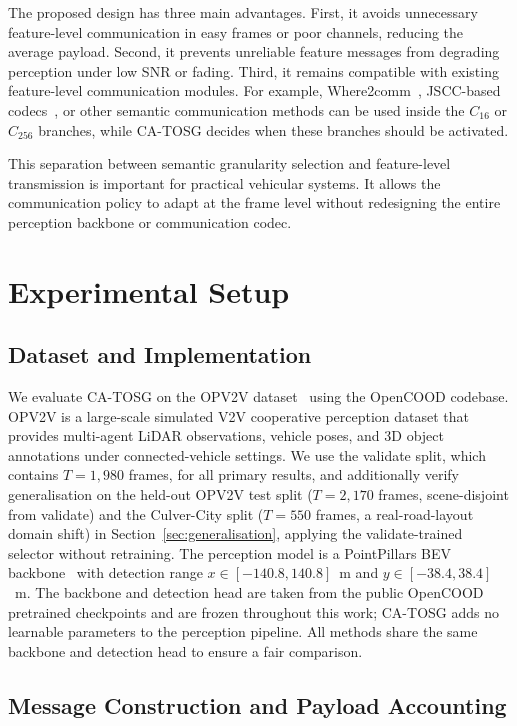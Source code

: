 \documentclass[journal]{IEEEtran}
\newcommand{\method}{CA-TOSG}
\begin{document}
The proposed design has three main advantages. First, it avoids unnecessary feature-level communication in easy frames or poor channels, reducing the average payload. Second, it prevents unreliable feature messages from degrading perception under low SNR or fading. Third, it remains compatible with existing feature-level communication modules. For example, Where2comm~\cite{hu2022where2comm}, JSCC-based codecs~\cite{sheng2024importance}, or other semantic communication methods can be used inside the $C_{16}$ or $C_{256}$ branches, while \method{} decides when these branches should be activated.

This separation between semantic granularity selection and feature-level transmission is important for practical vehicular systems. It allows the communication policy to adapt at the frame level without redesigning the entire perception backbone or communication codec.

\section{Experimental Setup}\label{sec:exp}

\subsection{Dataset and Implementation}

We evaluate \method{} on the OPV2V dataset~\cite{xu2022opv2v} using the OpenCOOD codebase. OPV2V is a large-scale simulated V2V cooperative perception dataset that provides multi-agent LiDAR observations, vehicle poses, and 3D object annotations under connected-vehicle settings. We use the validate split, which contains $T=1{,}980$ frames, for all primary results, and additionally verify generalisation on the held-out OPV2V test split ($T=2{,}170$ frames, scene-disjoint from validate) and the Culver-City split ($T=550$ frames, a real-road-layout domain shift) in Section~\ref{sec:generalisation}, applying the validate-trained selector without retraining. The perception model is a PointPillars BEV backbone~\cite{lang2019pointpillars} with detection range $x \in [-140.8, 140.8]$~m and $y \in [-38.4, 38.4]$~m. The backbone and detection head are taken from the public OpenCOOD pretrained checkpoints and are frozen throughout this work; \method{} adds no learnable parameters to the perception pipeline. All methods share the same backbone and detection head to ensure a fair comparison.

\subsection{Message Construction and Payload Accounting}
\end{document}
